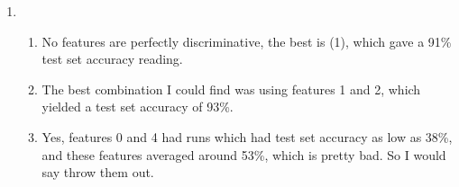 \documentclass[10pt,oneside,reqno]{amsart}
\theoremstyle{plain}
\theoremstyle{definition}
\begin{document}
\begin{enumerate}[label=5.]

\item

\begin{enumerate}
\item No features are perfectly discriminative, the best is (1), which gave a 91\% test set accuracy reading. 
\item The best combination I could find was using features 1 and 2, which yielded a test set accuracy of 93\%. 

\item Yes, features 0 and 4 had runs which had test set accuracy as low as 38\%, and these features averaged around 53\%, which is pretty bad. So I would say throw them out. 


\end{enumerate}



\end{enumerate}
\end{document}
